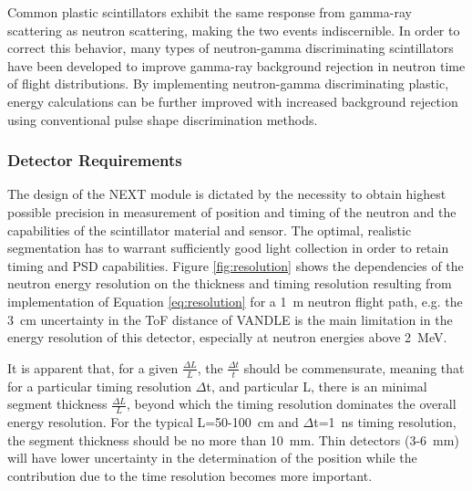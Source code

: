 \documentclass[preprint,3p,twocolumn]{elsarticle}
\begin{document}
Common plastic scintillators exhibit the same response from gamma-ray scattering as neutron scattering, making the two events indiscernible. In order to correct this behavior, many types of neutron-gamma discriminating scintillators have been developed to improve gamma-ray background rejection in neutron time of flight distributions. By implementing neutron-gamma discriminating plastic, energy calculations can be further improved with increased background rejection using conventional pulse shape discrimination methods.

\subsubsection{Detector Requirements}

The design of the NEXT module is dictated by the necessity to obtain highest possible precision in measurement of position and timing of the neutron and the capabilities of the scintillator material and sensor. The optimal, realistic segmentation has to warrant sufficiently good light collection in order to retain timing and PSD capabilities. Figure \ref{fig:resolution} shows the dependencies of the  neutron energy resolution on the thickness and timing resolution resulting from implementation of Equation \ref{eq:resolution} for a 1~m neutron flight path, e.g. the 3~cm uncertainty in the ToF distance of VANDLE \cite{PETERS2016122} is the main limitation in the energy resolution of this detector, especially at neutron energies above 2~MeV.

It is apparent that, for a given $\frac{\Delta L}{L}$, the $\frac{\Delta t}{t}$  should be commensurate, meaning that for a particular timing resolution $\Delta$t, and particular L, there is an minimal segment thickness $\frac{\Delta L}{L}$, beyond which the timing resolution dominates the overall energy resolution. For the typical L=50-100~cm and $\Delta$t=1~ns  timing resolution, the segment thickness should be no more than 10~mm. Thin detectors (3-6~mm) will have lower uncertainty in the determination of the position while the contribution due to the time resolution becomes more important.
\end{document}
